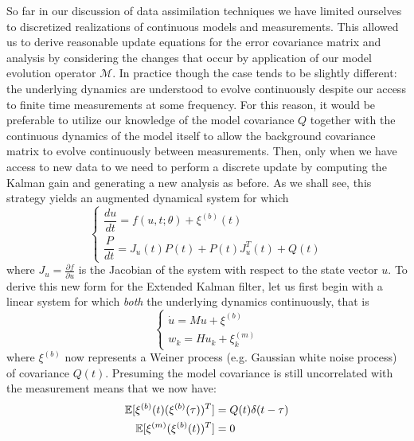 So far in our discussion of data assimilation techniques we have limited ourselves to discretized realizations of continuous models and measurements. This allowed us to derive reasonable update equations for the error covariance matrix and analysis by considering the changes that occur by application of our model evolution operator $\mathcal{M}$. In practice though the case tends to be slightly different: the underlying dynamics are understood to evolve continuously despite our access to finite time measurements at some frequency. For this reason, it would be preferable to utilize our knowledge of the model covariance $Q$ together with the continuous dynamics of the model itself to allow the background covariance matrix to evolve continuously between measurements. Then, only when we have access to new data to we need to perform a discrete update by computing the Kalman gain and generating a new analysis as before. As we shall see, this strategy yields an augmented dynamical system for which
\begin{equation}
  \begin{cases}
    \dfrac{du}{dt} = f(u,t;\theta) + \xi^{(b)}(t) \\
    \dfrac{P}{dt} = J_{u}(t)P(t) + P(t)J_{u}^T(t) + Q(t)
  \end{cases}
\end{equation}
where $J_{u}=\frac{\partial f}{\partial u}$ is the Jacobian of the system with respect to the state vector $u$. To derive this new form for the Extended Kalman filter, let us first begin with a linear system for which \textit{both} the underlying dynamics continuously, that is
\begin{equation}
  \begin{cases}
    \dot{u} = Mu + \xi^{(b)} \\
    w_k = Hu_k + \xi^{(m)}_k
  \end{cases}
\end{equation}
where $\xi^{(b)}$ now represents a Weiner process (e.g. Gaussian white noise process) of covariance $Q(t)$. Presuming the model covariance is still uncorrelated with the measurement means that we now have:
\begin{align}
  \mathbb{E}[\xi^{(b)}(t)(\xi^{(b)}(\tau))^T] &= Q(t)\delta (t-\tau) \\
  \mathbb{E}[\xi^{(m)}(\xi^{(b)}(t))^T] &= 0
\end{align}

